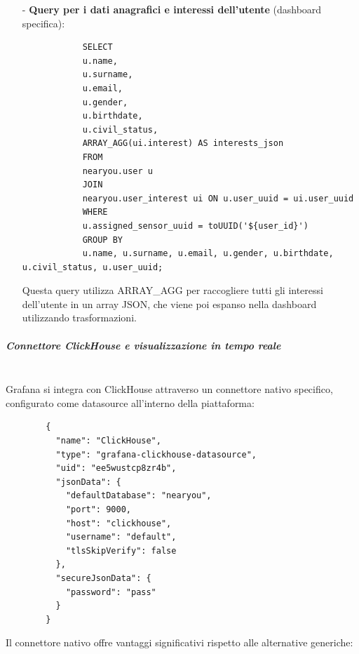 \documentclass[10pt]{article}
\newcommand{\mysubparagraph}[1]{\subparagraph{#1}\mbox{}\\}
\begin{document}
\begin{itemize}
            \item[-] \textbf{Query per i dati anagrafici e interessi dell'utente} (dashboard specifica):
            \begin{lstlisting}
            SELECT
            u.name,
            u.surname,
            u.email,
            u.gender,
            u.birthdate,
            u.civil_status,
            ARRAY_AGG(ui.interest) AS interests_json
            FROM
            nearyou.user u
            JOIN
            nearyou.user_interest ui ON u.user_uuid = ui.user_uuid
            WHERE
            u.assigned_sensor_uuid = toUUID('${user_id}')
            GROUP BY
            u.name, u.surname, u.email, u.gender, u.birthdate, u.civil_status, u.user_uuid;
            \end{lstlisting}
            Questa query utilizza ARRAY\_AGG per raccogliere tutti gli interessi dell'utente in un array JSON, che viene poi espanso nella dashboard utilizzando trasformazioni.
        \end{itemize}

        \mysubparagraph{Connettore ClickHouse e visualizzazione in tempo reale}
        Grafana si integra con ClickHouse attraverso un connettore nativo specifico, configurato come datasource all'interno della piattaforma:

        \begin{lstlisting}
        {
          "name": "ClickHouse",
          "type": "grafana-clickhouse-datasource",
          "uid": "ee5wustcp8zr4b",
          "jsonData": {
            "defaultDatabase": "nearyou",
            "port": 9000,
            "host": "clickhouse",
            "username": "default",
            "tlsSkipVerify": false
          },
          "secureJsonData": {
            "password": "pass"
          }
        }
        \end{lstlisting}

        Il connettore nativo offre vantaggi significativi rispetto alle alternative generiche:
\end{document}
